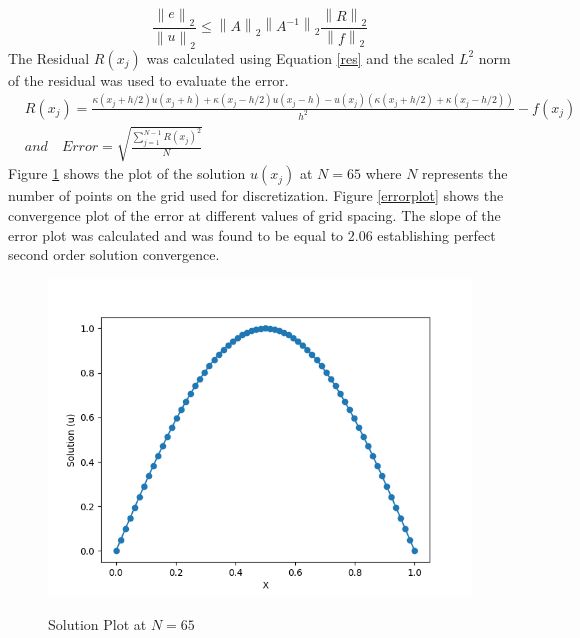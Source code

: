 \documentclass[12pt,dvipsnames]{article}
\newcommand\norm[1]{\left\lVert#1\right\rVert}
\newcommand{\an}[1]{{\leavevmode\color{BrickRed}{#1}}}
\begin{document}
\begin{equation}\label{eqerror}
    \frac{\norm{e}_2}{\norm{u}_2} \leq \norm{A}_2 \norm{A^{-1}}_2 \frac{\norm{R}_2}{\norm{f}_2}
\end{equation}
\an{All the above is ok, but again this is all an artifact of using iterative methods. If you use direct methods (which is very possible on this problem) then you won't have to worry about the problems above. Generally speaking, iterative methods for linear problems use the residual ($R$) rather than the difference between iterates to ascertain convergence. Of course, nonlinear optimization methods will use the difference between iterates generally.}
The Residual $R(x_j)$ was calculated using Equation \ref{res} and the scaled $L^2$ norm of the residual was used to evaluate the error.
\begin{equation} \label{res}
    \begin{aligned}
        & R(x_j) = \frac{\kappa( x_j + h/2 ) u(x_j + h) + \kappa( x_j - h/2 )u( x_j - h ) - u(x_j)( \kappa(x_j + h/2) + \kappa(x_j - h/2) )}{h^2} - f(x_j) \\
        & and \quad Error = \sqrt{ \frac{\sum_{j = 1}^{N - 1} R(x_j)^2}{N} }
    \end{aligned}
\end{equation}
\an{You label the residual norm above as ``error'', but this is confusing terminology since you do not mean it's the error in the solution.}
Figure \ref{solplot} shows the plot of the solution $u(x_j)$ at $N = 65$ where $N$ represents the number of points on the grid used for discretization. Figure \ref{errorplot} shows the convergence plot of the error at different values of grid spacing. The slope of the error plot was calculated and was found to be equal to $2.06$ establishing perfect second order solution convergence. 
\begin{figure}
\centering
    {\includegraphics[width=14cm]{Solution_Plot_65.png} }%
    \caption{Solution Plot at $N = 65$}%
    \label{solplot}%
\end{figure}
\end{document}
